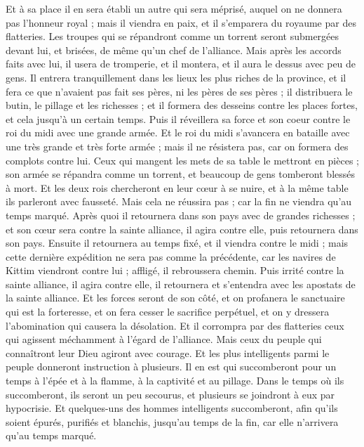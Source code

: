 \begin{multicols}{2}
Et à sa place il en sera établi un autre qui sera méprisé, auquel on ne donnera pas l'honneur royal ; mais il viendra en paix, et il s'emparera du royaume par des flatteries.
Les troupes qui se répandront comme un torrent seront submergées devant lui, et brisées, de même qu'un chef de l'alliance.
Mais après les accords faits avec lui, il usera de tromperie, et il montera, et il aura le dessus avec peu de gens.
Il entrera tranquillement dans les lieux les plus riches de la province, et il fera ce que n'avaient pas fait ses pères, ni les pères de ses pères ; il distribuera le butin, le pillage et les richesses ; et il formera des desseins contre les places fortes, et cela jusqu'à un certain temps.
Puis il réveillera sa force et son coeur contre le roi du midi avec une grande armée. Et le roi du midi s'avancera en bataille avec une très grande et très forte armée ; mais il ne résistera pas, car on formera des complots contre lui.
Ceux qui mangent les mets de sa table le mettront en pièces ; son armée se répandra comme un torrent, et beaucoup de gens tomberont blessés à mort.
Et les deux rois chercheront en leur cœur à se nuire, et à la même table ils parleront avec fausseté. Mais cela ne réussira pas ; car la fin ne viendra qu'au temps marqué.
Après quoi il retournera dans son pays avec de grandes richesses ; et son cœur sera contre la sainte alliance, il agira contre elle, puis retournera dans son pays.
Ensuite il retournera au temps fixé, et il viendra contre le midi ; mais cette dernière expédition ne sera pas comme la précédente,
car les navires de Kittim viendront contre lui ; affligé, il rebroussera chemin. Puis irrité contre la sainte alliance, il agira contre elle, il retournera et s'entendra avec les apostats de la sainte alliance.
Et les forces seront de son côté, et on profanera le sanctuaire qui est la forteresse, et on fera cesser le sacrifice perpétuel, et on y dressera l'abomination qui causera la désolation.
Et il corrompra par des flatteries ceux qui agissent méchamment à l'égard de l'alliance. Mais ceux du peuple qui connaîtront leur Dieu agiront avec courage.
Et les plus intelligents parmi le peuple donneront instruction à plusieurs. Il en est qui succomberont pour un temps à l'épée et à la flamme, à la captivité et au pillage.
Dans le temps où ils succomberont, ils seront un peu secourus, et plusieurs se joindront à eux par hypocrisie.
Et quelques-uns des hommes intelligents succomberont, afin qu'ils soient épurés, purifiés et blanchis, jusqu'au temps de la fin, car elle n'arrivera qu'au temps marqué.

\end{multicols}
